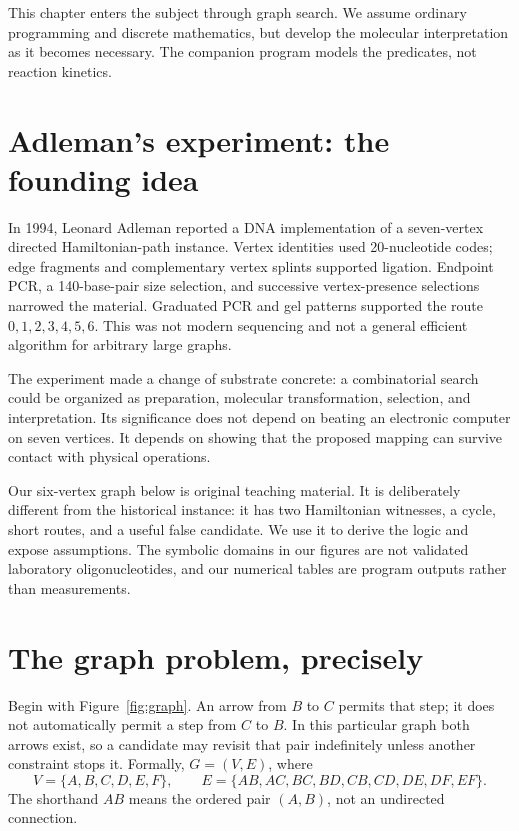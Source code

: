 This chapter enters the subject through graph search. We assume ordinary programming and discrete mathematics, but develop the molecular interpretation as it becomes necessary. The companion program models the predicates, not reaction kinetics.

\section{Adleman's experiment: the founding idea}\label{sec:history}
In 1994, Leonard Adleman reported a DNA implementation of a seven-vertex directed Hamiltonian-path instance. Vertex identities used 20-nucleotide codes; edge fragments and complementary vertex splints supported ligation. Endpoint PCR, a 140-base-pair size selection, and successive vertex-presence selections narrowed the material. Graduated PCR and gel patterns supported the route $0,1,2,3,4,5,6$. This was not modern sequencing and not a general efficient algorithm for arbitrary large graphs.\cite{adleman}

The experiment made a change of substrate concrete: a combinatorial search could be organized as preparation, molecular transformation, selection, and interpretation. Its significance does not depend on beating an electronic computer on seven vertices. It depends on showing that the proposed mapping can survive contact with physical operations.

Our six-vertex graph below is original teaching material. It is deliberately different from the historical instance: it has two Hamiltonian witnesses, a cycle, short routes, and a useful false candidate. We use it to derive the logic and expose assumptions. The symbolic domains in our figures are not validated laboratory oligonucleotides, and our numerical tables are program outputs rather than measurements.

\section{The graph problem, precisely}\label{sec:graph}
Begin with Figure~\ref{fig:graph}. An arrow from $B$ to $C$ permits that step; it does not automatically permit a step from $C$ to $B$. In this particular graph both arrows exist, so a candidate may revisit that pair indefinitely unless another constraint stops it.
Formally, $G=(V,E)$, where
\[
 V=\{A,B,C,D,E,F\},\qquad
 E=\{AB,AC,BC,BD,CB,CD,DE,DF,EF\}.
\]
The shorthand $AB$ means the ordered pair $(A,B)$, not an undirected connection.

